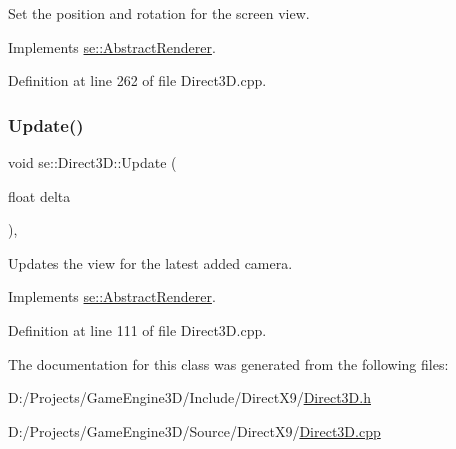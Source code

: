 Set the position and rotation for the screen view. 

Implements \mbox{\hyperlink{classse_1_1_abstract_renderer_a710e67232e977fbb3b74f79640e0b62e}{se\+::\+Abstract\+Renderer}}.



Definition at line 262 of file Direct3\+D.\+cpp.

\mbox{\label{classse_1_1_direct3_d_a39934c194406f108a992d82a4d265381}} 
\subsubsection{\texorpdfstring{Update()}{Update()}}
{\footnotesize\ttfamily void se\+::\+Direct3\+D\+::\+Update (\begin{DoxyParamCaption}\item[{float}]{delta }\end{DoxyParamCaption})\hspace{0.3cm}{\ttfamily [override]}, {\ttfamily [virtual]}}

Updates the view for the latest added camera. 

Implements \mbox{\hyperlink{classse_1_1_abstract_renderer_aae49e7417663d6a5aca34a2bb37b4b28}{se\+::\+Abstract\+Renderer}}.



Definition at line 111 of file Direct3\+D.\+cpp.



The documentation for this class was generated from the following files\+:\begin{DoxyCompactItemize}
\item 
D\+:/\+Projects/\+Game\+Engine3\+D/\+Include/\+Direct\+X9/\mbox{\hyperlink{_direct3_d_8h}{Direct3\+D.\+h}}\item 
D\+:/\+Projects/\+Game\+Engine3\+D/\+Source/\+Direct\+X9/\mbox{\hyperlink{_direct3_d_8cpp}{Direct3\+D.\+cpp}}\end{DoxyCompactItemize}
